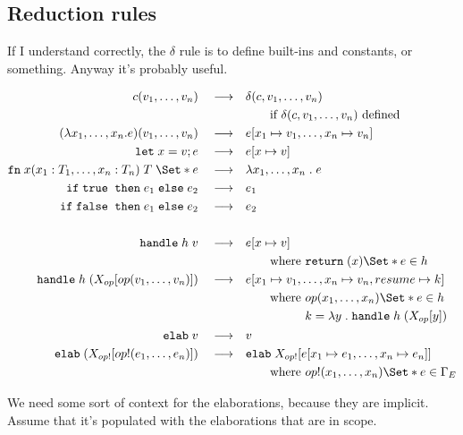 \documentclass{article}
\newcommand\kw[1]{\mathbf{\mathtt{#1}}\;}
\newcommand\true{\kw{true}}
\newcommand\false{\kw{false}}
\newcommand\val{\kw{let}}
\newcommand\fn{\kw{fn}}
\newcommand\return[0]{\kw{return}}
\newcommand\cond[3]{\kw{if} #1\;\kw{then} #2\;\kw{else} #3}
\newcommand\handle[2]{\kw{handle} #1\;#2}
\newcommand\elab[1]{\kw{elab}#1}
\newcommand\f[2]{\lambda #1\;.\;#2}
\renewcommand\S{\Set*}
\begin{document}
\subsection{Reduction rules}

If I understand correctly, the $\delta$ rule is to define built-ins and constants, or something. Anyway it's probably useful.

\newcommand{\reduce}{\quad\longrightarrow\quad}
\begin{align*}
    c(v_1, \dots, v_n) \reduce& \delta(c, v_1, \dots, v_n) \\
    &\qquad\text{if } \delta(c, v_1, \dots, v_n) \text{ defined}\\
    (\lambda x_1, \dots, x_n . e) (v_1, \dots, v_n) \reduce& e[x_1 \mapsto v_1, \dots, x_n \mapsto v_n] \\
    \val x = v; e \reduce& e[x \mapsto v] \\
    \fn x(x_1: T_1, \dots, x_n: T_n)\;T\;\S{ e } \reduce& \f{x_1,\dots,x_n}{e}\\
    \cond{\true}{e_1}{e_2} \reduce& e_1 \\
    \cond{\false}{e_1}{e_2} \reduce& e_2 \\
    \\
    \handle{h}{v} \reduce& e[x\mapsto v] \\
    &\qquad\text{where } \return(x) \S{ e } \in h\\
    \handle{h}{(X_{op}[op(v_1, \dots, v_n)])} \reduce& e[x_1\mapsto v_1, \dots, x_n\mapsto v_n, resume \mapsto k] \\
    &\qquad \text{where } \begin{aligned}[t]
        & op(x_1, \dots, x_n) \S{e} \in h\\
        & k = \f{y}{\handle h (X_{op}[y])}
    \end{aligned}\\
    \elab v \reduce& v\\
    \elab (X_{op!}[op!(e_1, \dots, e_n)]) \reduce& \elab X_{op!}[e[x_1 \mapsto e_1, \dots, x_n \mapsto e_n]] \\
    &\qquad \text{where } op!(x_1, \dots, x_n) \S{e} \in \Gamma_E \\
\end{align*}

We need some sort of context for the elaborations, because they are implicit. Assume that it's populated with the elaborations that are in scope.
\end{document}
